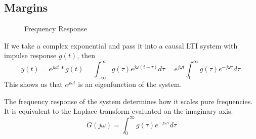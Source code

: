 \subsection{Margins}
\begin{figure}[H]
    \centering 
    \caption{Frequency Response}
    \label{fig:frequency-response}
\end{figure}
If we take a complex exponential and pass it into a causal LTI system with impulse response $g(t)$, then
\[
  y(t) = e^{j\omega t} * g(t) = \int_{-\infty}^{\infty}g(\tau)e^{j\omega(t-\tau)}d\tau = e^{j\omega t} \int_{0}^{\infty}g(\tau)e^{-j\omega \tau}d\tau.
\]
This shows us that $e^{j\omega t}$ is an eigenfunction of the system.
\begin{definition}
  The frequency response of the system determines how it scales pure frequencies. It is equivalent to the Laplace transform evaluated on the imaginary axis.
  \begin{equation}
	G(j\omega) = \int_0^{\infty}g(\tau)e^{-j\omega\tau}d\tau
	\label{eqn:frequency-response}
  \end{equation}
  \label{defn:frequency-response}
\end{definition}

